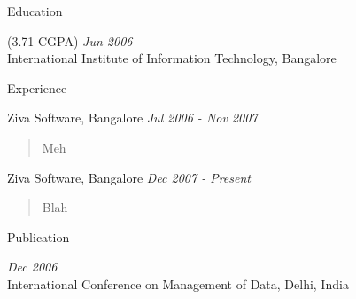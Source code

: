 \documentclass{resume}
\author{Siddhartha Reddy Kothakapu}
\newcommand{\period}{\hfill\small\sl}
\begin{document}
\maketitle

\begin{category}{Education}

     {\footnotesize(3.71 CGPA)} {\period Jun 2006}\\
    International Institute of Information Technology, Bangalore

\end{category}


\begin{category}{Experience}

     Ziva Software, Bangalore {\period Jul 2006 - Nov 2007}
    \begin{quote}
        Meh
    \end{quote}

     Ziva Software, Bangalore {\period Dec 2007 - Present}
    \begin{quote}
        Blah
    \end{quote}

\end{category}


\begin{category}{Publication}

     {\period Dec 2006}\\
    International Conference on Management of Data, Delhi, India

\end{category}
\end{document}

